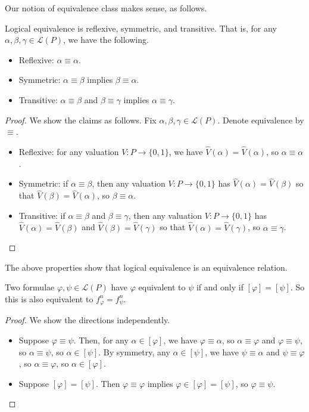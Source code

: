 \documentclass[../notes.tex]{subfiles}
\begin{document}
Our notion of equivalence class makes sense, as follows.
\begin{prop}
	Logical equivalence is reflexive, symmetric, and transitive. That is, for any $\alpha,\beta,\gamma\in\mathcal L(P)$, we have the following.
	\begin{itemize}
		\item Reflexive: $\alpha\equiv\alpha$.
		\item Symmetric: $\alpha\equiv\beta$ implies $\beta\equiv\alpha$.
		\item Transitive: $\alpha\equiv\beta$ and $\beta\equiv\gamma$ implies $\alpha\equiv\gamma$.
	\end{itemize}
\end{prop}
\begin{proof}
	We show the claims as follows. Fix $\alpha,\beta,\gamma\in\mathcal L(P)$. Denote equivalence by $\equiv$.
	\begin{itemize}
		\item Reflexive: for any valuation $V:P\to\{0,1\}$, we have $\hat V(\alpha)=\hat V(\alpha)$, so $\alpha\equiv\alpha$.
		\item Symmetric: if $\alpha\equiv\beta$, then any valuation $V:P\to\{0,1\}$ has $\hat V(\alpha)=\hat V(\beta)$ so that $\hat V(\beta)=\hat V(\alpha)$, so $\beta\equiv\alpha$.
		\item Transitive: if $\alpha\equiv\beta$ and $\beta\equiv\gamma$, then any valuation $V:P\to\{0,1\}$ has $\hat V(\alpha)=\hat V(\beta)$ and $\hat V(\beta)=\hat V(\gamma)$ so that $\hat V(\alpha)=\hat V(\gamma)$, so $\alpha\equiv\gamma$.
		\qedhere
	\end{itemize}
\end{proof}
\begin{remark}
	The above properties show that logical equivalence is an equivalence relation.
\end{remark}
\begin{corollary}
	Two formulae $\varphi,\psi\in\mathcal L(P)$ have $\varphi$ equivalent to $\psi$ if and only if $[\varphi]=[\psi]$. So this is also equivalent to $f_\varphi^n=f_\psi^n$.
\end{corollary}
\begin{proof}
	We show the directions independently.
	\begin{itemize}
		\item Suppose $\varphi\equiv\psi$. Then, for any $\alpha\in[\varphi]$, we have $\varphi\equiv\alpha$, so $\alpha\equiv\varphi$ and $\varphi\equiv\psi$, so $\alpha\equiv\psi$, so $\alpha\in[\psi]$. By symmetry, any $\alpha\in[\psi]$, we have $\psi\equiv\alpha$ and $\psi\equiv\varphi$, so $\alpha\equiv\varphi$, so $\alpha\in[\varphi]$.
		\item Suppose $[\varphi]=[\psi]$. Then $\varphi\equiv\varphi$ implies $\varphi\in[\varphi]=[\psi]$, so $\varphi\equiv\psi$.
		\qedhere
	\end{itemize}
\end{proof}
\end{document}
